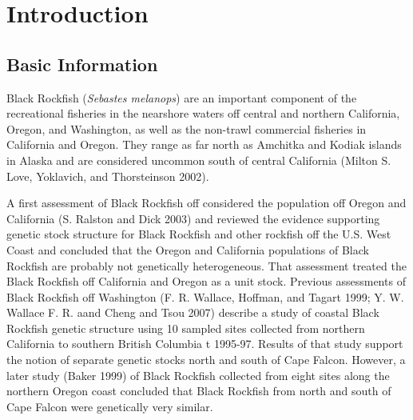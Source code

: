 \documentclass[11pt,
  english,
  letterpaper,
]{article}
\begin{document}
\vspace{500cm}

\pagebreak
\setlength{\parskip}{5mm plus1mm minus1mm}
\setcounter{page}{1}
\renewcommand{\thefigure}{\arabic{figure}}
\renewcommand{\thetable}{\arabic{table}}
\setcounter{table}{0}
\setcounter{figure}{0}

\hypertarget{introduction}{%
\section{Introduction}\label{introduction}}

\hypertarget{basic-information}{%
\subsection{Basic Information}\label{basic-information}}

Black Rockfish (\emph{Sebastes melanops}) are an important component of the recreational fisheries in the nearshore waters off central and northern California, Oregon, and Washington, as well as the non-trawl commercial fisheries in California and Oregon. They range as far north as Amchitka and Kodiak islands in Alaska and are considered uncommon south of central California (Milton S. Love, Yoklavich, and Thorsteinson 2002).

A first assessment of Black Rockfish off considered the population off Oregon and California (S. Ralston and Dick 2003) and reviewed the evidence supporting genetic stock structure for Black Rockfish and other rockfish off the U.S. West Coast and concluded that the Oregon and California populations of Black Rockfish are probably not genetically heterogeneous. That assessment treated the Black Rockfish off California and Oregon as a unit stock. Previous assessments of Black Rockfish off Washington (F. R. Wallace, Hoffman, and Tagart 1999; Y. W. Wallace F. R. aand Cheng and Tsou 2007) describe a study of coastal Black Rockfish genetic structure using 10 sampled sites collected from northern California to southern British Columbia t 1995-97. Results of that study support the notion of separate genetic stocks north and south of Cape Falcon. However, a later study (Baker 1999) of Black Rockfish collected from eight sites along the northern Oregon coast concluded that Black Rockfish from north and south of Cape Falcon were genetically very similar.
\end{document}
